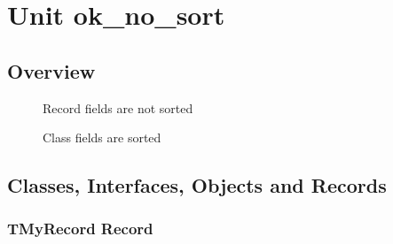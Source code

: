 \documentclass{report}
\newif\ifpdf
\begin{document}
\label{toc}\tableofcontents
\newpage
\newlength{\tmplength}
\chapter{Unit ok{\_}no{\_}sort}
\label{ok_no_sort}
\section{Overview}
\begin{description}
\item[\texttt{\begin{ttfamily}TMyRecord\end{ttfamily} Record}]Record fields are not sorted
\item[\texttt{\begin{ttfamily}TMyClass\end{ttfamily} Class}]Class fields are sorted
\end{description}
\section{Classes, Interfaces, Objects and Records}
\ifpdf
\subsection*{\large{\textbf{TMyRecord Record}}\normalsize\hspace{1ex}\hrulefill}
\else
\subsection*{TMyRecord Record}
\fi
\label{ok_no_sort.TMyRecord}
\end{document}
